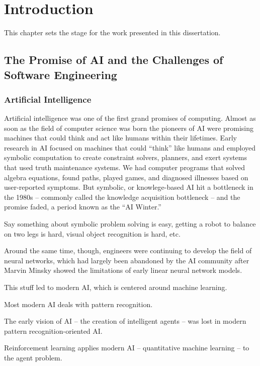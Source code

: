 \chapter{Introduction}

This chapter sets the stage for the work presented in this dissertation.

\section{The Promise of AI and the Challenges of Software Engineering}


\subsection{Artificial Intelligence}

Artificial intelligence was one of the first grand promises of computing. Almost as soon as the field of computer science was born the pioneers of AI were promising machines that could think and act like humans within their lifetimes. Early research in AI focused on machines that could ``think'' like humans and employed symbolic computation to create constraint solvers, planners, and exert systems that used truth maintenance systems. We had computer programs that solved algebra equations, found paths, played games, and diagnosed illnesses based on user-reported symptoms. But symbolic, or knowlege-based AI hit a bottleneck in the 1980s -- commonly called the knowledge acquisition bottleneck -- and the promise faded, a period known as the ``AI Winter.''

Say something about symbolic problem solving is easy, getting a robot to balance on two legs is hard, visual object recognition is hard, etc.

Around the same time, though, engineers were continuing to develop the field of neural networks, which had largely been abandoned by the AI community after Marvin Minsky showed the limitations of early linear neural network models.

This stuff led to modern AI, which is centered around machine learning.

Most modern AI deals with pattern recognition.

The early vision of AI -- the creation of intelligent agents -- was lost in modern pattern recognition-oriented AI.

Reinforcement learning applies modern AI -- quantitative machine learning -- to the agent problem.

